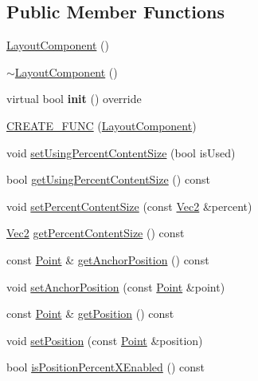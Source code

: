 \subsection*{Public Member Functions}
\begin{DoxyCompactItemize}
\item 
\hyperlink{classui_1_1LayoutComponent_ab67f1d89a3f62b9acd30506ef6635cba}{Layout\+Component} ()
\item 
\hyperlink{classui_1_1LayoutComponent_a6e3325f4c64c5c7e48900b03e706ecac}{$\sim$\+Layout\+Component} ()
\item 
\mbox{\label{classui_1_1LayoutComponent_a6656bf8796da22b7eccd7f8889f558c9}} 
virtual bool {\bfseries init} () override
\item 
\hyperlink{classui_1_1LayoutComponent_ae8c296aa496ccf281461adba27a9955f}{C\+R\+E\+A\+T\+E\+\_\+\+F\+U\+NC} (\hyperlink{classui_1_1LayoutComponent}{Layout\+Component})
\item 
void \hyperlink{classui_1_1LayoutComponent_a1b647bfd14f2c29fd9790e0aa753bf26}{set\+Using\+Percent\+Content\+Size} (bool is\+Used)
\item 
bool \hyperlink{classui_1_1LayoutComponent_abd8b705e269551116208cec448cd230e}{get\+Using\+Percent\+Content\+Size} () const
\item 
void \hyperlink{classui_1_1LayoutComponent_ac1b75e3b3340dfeead80af4bc6732ef5}{set\+Percent\+Content\+Size} (const \hyperlink{classVec2}{Vec2} \&percent)
\item 
\hyperlink{classVec2}{Vec2} \hyperlink{classui_1_1LayoutComponent_a504d9311e533c902d44aa415f9027a4f}{get\+Percent\+Content\+Size} () const
\item 
const \hyperlink{classVec2}{Point} \& \hyperlink{classui_1_1LayoutComponent_a5113f246904b0d301db22cd39d322e15}{get\+Anchor\+Position} () const
\item 
void \hyperlink{classui_1_1LayoutComponent_ae6d9fb9a3ca2f54076975d7723bb9f16}{set\+Anchor\+Position} (const \hyperlink{classVec2}{Point} \&point)
\item 
const \hyperlink{classVec2}{Point} \& \hyperlink{classui_1_1LayoutComponent_a2879ddfdc6a4e4101499d27e6024854b}{get\+Position} () const
\item 
void \hyperlink{classui_1_1LayoutComponent_ac965de551371d6087f29d3bcfccb11d9}{set\+Position} (const \hyperlink{classVec2}{Point} \&position)
\item 
bool \hyperlink{classui_1_1LayoutComponent_a6918d9366c8e524788cbe58f786d8075}{is\+Position\+Percent\+X\+Enabled} () const

\end{DoxyCompactItemize}

